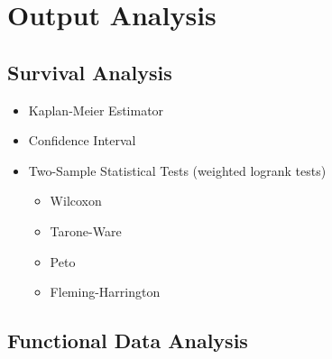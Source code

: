 \section{Output Analysis}


  \subsection{Survival Analysis}

     \begin{itemize}
          \item Kaplan-Meier Estimator \cite{kaplan1958nonparametric} \cite{aalen2008survival}\cite{cameron_davidson_pilon_2021_4505728}
          \item Confidence Interval \cite{greenwoodnatural} \cite{hosmer2011applied} \cite{kalbfleisch2011statistical}\cite{sawyer2003greenwood}
          \item Two-Sample Statistical Tests (weighted logrank tests) \cite{custodio2007diagnostics} \cite{agarwal2012statistics} \cite{karadeniz2017examining} \cite{leton2001equivalence} \cite{etikan2017kaplan} \cite{harrington1982class}
            \begin{itemize}
              \item Wilcoxon
              \item Tarone-Ware
              \item Peto
              \item Fleming-Harrington
            \end{itemize}
            
     \end{itemize}



 \subsection{Functional Data Analysis \cite{wang2015review}}
